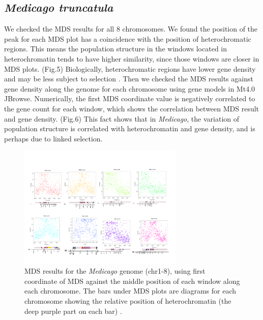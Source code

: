 \documentclass[11pt, oneside]{article}   	%
\begin{document}
\subsection{\textit{Medicago truncatula}}
We checked the MDS results for all 8 chromosomes. We found the position of the peak for each MDS plot has a coincidence with the position of heterochromatic regions. This means the population structure in the windows located in heterochromatin tends to have higher similarity, since those windows are closer in MDS plots. (Fig.5) Biologically,
heterochromatic regions have lower gene density and may be less subject to selection \citep{kulikova2001integration,paape2013selection}. Then we checked the MDS results against gene density along the genome for each chromosome using gene models in Mt4.0 JBrowse. Numerically, the first MDS coordinate value is negatively correlated to the gene count for each window, which shows the correlation between MDS result and gene density. (Fig.6) This fact shows that in \textit{Medicago}, the variation of population structure is correlated with heterochromatin and gene density, and is perhaps due to linked selection.

\begin{figure}
    \begin{center}
       \includegraphics[width=0.7\textwidth]{fig5}
    \end{center}
    \caption{
         MDS results for the \textit{Medicago} genome (chr1-8), using first coordinate of MDS against the middle position of each window along each chromosome. 
         The bars under MDS plots are diagrams for each chromosome showing the relative position of heterochromatin (the deep purple part on each bar) \citep{kulikova2004satellite, kulikova2001integration}.
        \label{fig:pde_clines}
    }
\end{figure}
\end{document}
